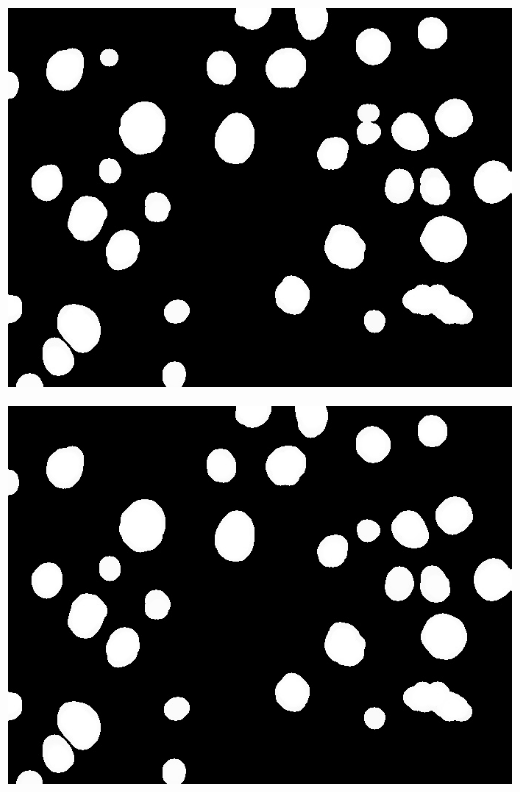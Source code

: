 \documentclass[a4paper]{article}
\begin{document}
\begin{minipage}{0.24\textwidth}
    \centering
    \includegraphics[width=\textwidth]{../code/task1/output/kernel_size_25.jpg}
\end{minipage}
\hfill
\begin{minipage}{0.24\textwidth}
    \centering
    \includegraphics[width=\textwidth]{../code/task1/output/kernel_size_27.jpg}
\end{minipage}
\hfill
\end{document}
